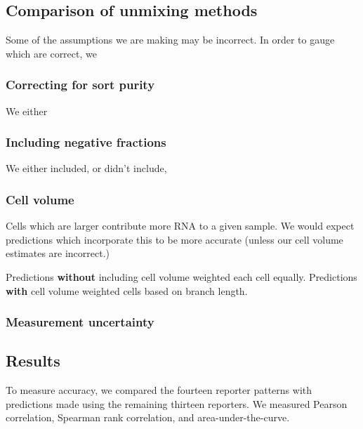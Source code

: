 \documentclass{article}
\begin{document}
\subsection*{Comparison of unmixing methods}

Some of the assumptions we are making may be incorrect. In order to gauge
which are correct, we




\subsubsection*{Correcting for sort purity}

We either 



\subsubsection*{Including negative fractions}

We either included, or didn't include, 



\subsubsection*{Cell volume}

Cells which are larger contribute more RNA to a given sample.
We would expect predictions which incorporate this to be more accurate
(unless our cell volume estimates are incorrect.)

Predictions {\bf without} including cell volume weighted each cell equally.
Predictions {\bf with} cell volume weighted cells based on branch length.



\subsubsection*{Measurement uncertainty}







\subsection*{Results}

To measure accuracy, we compared the fourteen reporter patterns
with predictions made using the remaining thirteen reporters.
We measured Pearson correlation, Spearman rank correlation,
and area-under-the-curve.
\end{document}
